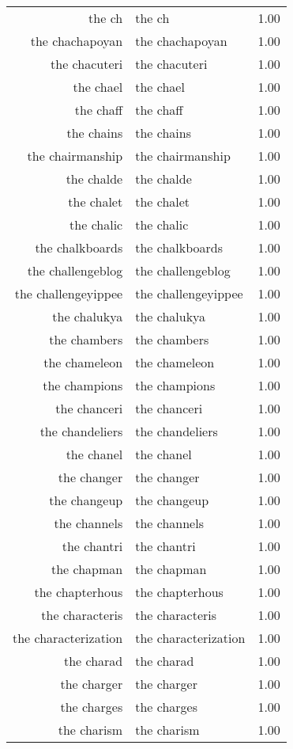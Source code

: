 \begin{table}[ht]
\begin{tabular}{rlr}
  the ch & the ch & 1.00 \\ 
  the chachapoyan & the chachapoyan & 1.00 \\ 
  the chacuteri & the chacuteri & 1.00 \\ 
  the chael & the chael & 1.00 \\ 
  the chaff & the chaff & 1.00 \\ 
  the chains & the chains & 1.00 \\ 
  the chairmanship & the chairmanship & 1.00 \\ 
  the chalde & the chalde & 1.00 \\ 
  the chalet & the chalet & 1.00 \\ 
  the chalic & the chalic & 1.00 \\ 
  the chalkboards & the chalkboards & 1.00 \\ 
  the challengeblog & the challengeblog & 1.00 \\ 
  the challengeyippee & the challengeyippee & 1.00 \\ 
  the chalukya & the chalukya & 1.00 \\ 
  the chambers & the chambers & 1.00 \\ 
  the chameleon & the chameleon & 1.00 \\ 
  the champions & the champions & 1.00 \\ 
  the chanceri & the chanceri & 1.00 \\ 
  the chandeliers & the chandeliers & 1.00 \\ 
  the chanel & the chanel & 1.00 \\ 
  the changer & the changer & 1.00 \\ 
  the changeup & the changeup & 1.00 \\ 
  the channels & the channels & 1.00 \\ 
  the chantri & the chantri & 1.00 \\ 
  the chapman & the chapman & 1.00 \\ 
  the chapterhous & the chapterhous & 1.00 \\ 
  the characteris & the characteris & 1.00 \\ 
  the characterization & the characterization & 1.00 \\ 
  the charad & the charad & 1.00 \\ 
  the charger & the charger & 1.00 \\ 
  the charges & the charges & 1.00 \\ 
  the charism & the charism & 1.00 \\ 

\end{tabular}
\end{table}
